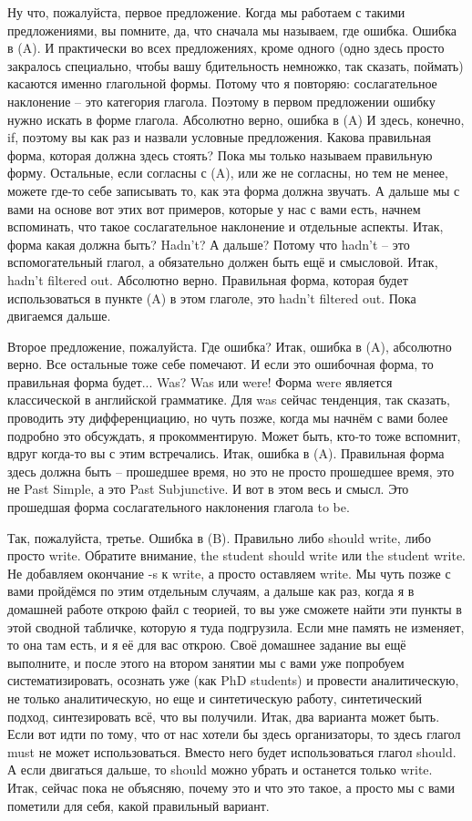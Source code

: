 \documentclass[main.tex]{subfiles}
\begin{document}
Ну что, пожалуйста, первое предложение.
Когда мы работаем с такими предложениями, вы помните, да, что сначала мы называем, где ошибка.
Ошибка в (A).
И практически во всех предложениях, кроме одного (одно здесь просто закралось специально, чтобы вашу бдительность немножко, так сказать, поймать) касаются именно глагольной формы.
Потому что я повторяю: сослагательное наклонение -- это категория глагола.
Поэтому в первом предложении ошибку нужно искать в форме глагола.
Абсолютно верно, ошибка в (A)
И здесь, конечно, if, поэтому вы как раз и назвали условные предложения.
Какова правильная форма, которая должна здесь стоять? 
Пока мы только называем правильную форму.
Остальные, если согласны с (A), или же не согласны, но тем не менее, можете где-то себе записывать то, как эта форма должна звучать.
А дальше мы с вами на основе вот этих вот примеров, которые у нас с вами есть, начнем вспоминать, что такое сослагательное наклонение и отдельные аспекты.
Итак, форма какая должна быть?
Hadn't?
А дальше?
Потому что hadn't -- это вспомогательный глагол, а обязательно должен быть ещё и смысловой.
Итак, hadn't filtered out.
Абсолютно верно.
Правильная форма, которая будет использоваться в пункте (A) в этом глаголе, это hadn't filtered out.
Пока двигаемся дальше.

Второе предложение, пожалуйста.
Где ошибка? 
Итак, ошибка в (A), абсолютно верно.
Все остальные тоже себе помечают.
И если это ошибочная форма, то правильная форма будет...
Was?
Was или were!
Форма were является классической в английской грамматике.
Для was сейчас тенденция, так сказать, проводить эту дифференциацию, но чуть позже, когда мы начнём с вами более подробно это обсуждать, я прокомментирую.
Может быть, кто-то тоже вспомнит, вдруг когда-то вы с этим встречались.
Итак, ошибка в (A).
Правильная форма здесь должна быть -- прошедшее время, но это не просто прошедшее время, это не Past Simple, а это Past Subjunctive.
И вот в этом весь и смысл.
Это прошедшая форма сослагательного наклонения глагола to be.

Так, пожалуйста, третье.
Ошибка в (B).
Правильно либо should write, либо просто write.
Обратите внимание, the student should write или the student write.
Не добавляем окончание -s к write, а просто оставляем write.
Мы чуть позже с вами пройдёмся по этим отдельным случаям, а дальше как раз, когда я в домашней работе открою файл с теорией, то вы уже сможете найти эти пункты в этой сводной табличке, которую я туда подгрузила.
Если мне память не изменяет, то она там есть, и я её для вас открою.
Своё домашнее задание вы ещё выполните, и после этого на втором занятии мы с вами уже попробуем систематизировать, осознать уже (как PhD students) и провести аналитическую, не только аналитическую, но еще и синтетическую работу, синтетический подход, синтезировать всё, что вы получили.
Итак, два варианта может быть.
Если вот идти по тому, что от нас хотели бы здесь организаторы, то здесь глагол must не может использоваться.
Вместо него будет использоваться глагол should.
А если двигаться дальше, то should можно убрать и останется только write.
Итак, сейчас пока не объясняю, почему это и что это такое, а просто мы с вами пометили для себя, какой правильный вариант.
\end{document}
